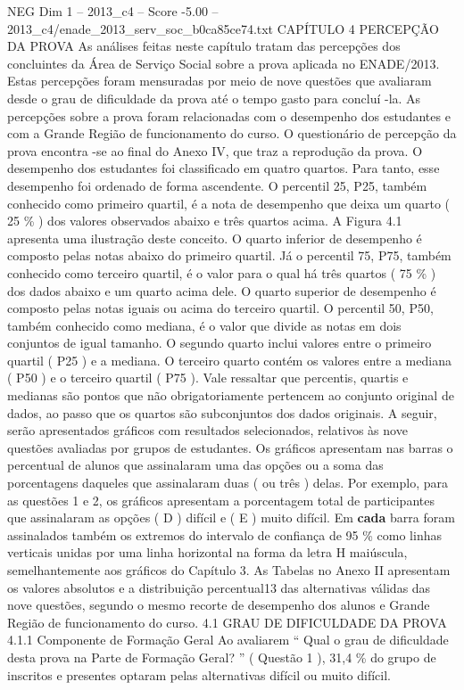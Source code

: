 \begin{textsample}{NEG Dim 1 – 2013\_c4 – Score -5.00 – 2013\_c4/enade\_2013\_serv\_soc\_b0ca85ce74.txt}  \label{ex:f1_neg_056}
CAPÍTULO 4 PERCEPÇÃO DA PROVA As análises feitas neste capítulo tratam das percepções dos concluintes da Área de Serviço Social sobre a prova aplicada no ENADE/2013.
Estas percepções foram mensuradas por meio de nove questões que avaliaram desde o grau de dificuldade da prova até o tempo gasto para concluí -la.
As percepções sobre a prova foram relacionadas com o desempenho dos estudantes e com a Grande Região de funcionamento do curso.
O questionário de percepção da prova encontra -se ao final do Anexo IV, que traz a reprodução da prova.
O desempenho dos estudantes foi classificado em quatro quartos.
Para tanto, esse desempenho foi ordenado de forma ascendente.
O percentil 25, P25, também conhecido como primeiro quartil, é a nota de desempenho que deixa um quarto ( 25 \% ) dos valores observados abaixo e três quartos acima.
A Figura 4.1 apresenta uma ilustração deste conceito.
O quarto inferior de desempenho é composto pelas notas abaixo do primeiro quartil.
Já o percentil 75, P75, também conhecido como terceiro quartil, é o valor para o qual há três quartos ( 75 \% ) dos dados abaixo e um quarto acima dele.
O quarto superior de desempenho é composto pelas notas iguais ou acima do terceiro quartil.
O percentil 50, P50, também conhecido como mediana, é o valor que divide as notas em dois conjuntos de igual tamanho.
O segundo quarto inclui valores entre o primeiro quartil ( P25 ) e a mediana.
O terceiro quarto contém os valores entre a mediana ( P50 ) e o terceiro quartil ( P75 ).
Vale ressaltar que percentis, quartis e medianas são pontos que não obrigatoriamente pertencem ao conjunto original de dados, ao passo que os quartos são subconjuntos dos dados originais.
A seguir, serão apresentados gráficos com resultados selecionados, relativos às nove questões avaliadas por grupos de estudantes.
Os gráficos apresentam nas barras o percentual de alunos que assinalaram uma das opções ou a soma das porcentagens daqueles que assinalaram duas ( ou três ) delas.
Por exemplo, para as questões 1 e 2, os gráficos apresentam a porcentagem total de participantes que assinalaram as opções ( D ) difícil e ( E ) muito difícil.
Em \textbf{cada} barra foram assinalados também os extremos do intervalo de confiança de 95 \% como linhas verticais unidas por uma linha horizontal na forma da letra H maiúscula, semelhantemente aos gráficos do Capítulo 3.
As Tabelas no Anexo II apresentam os valores absolutos e a distribuição percentual13 das alternativas válidas das nove questões, segundo o mesmo recorte de desempenho dos alunos e Grande Região de funcionamento do curso. 4.1 GRAU DE DIFICULDADE DA PROVA 4.1.1 Componente de Formação Geral Ao avaliarem “ Qual o grau de dificuldade desta prova na Parte de Formação Geral? ” ( Questão 1 ), 31,4 \% do grupo de inscritos e presentes optaram pelas alternativas difícil ou muito difícil.

\end{textsample}
